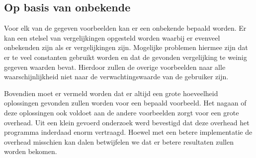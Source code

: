 \documentclass[Main.tex]{subfiles}
\begin{document}
\subsection{Op basis van onbekende}
Voor elk van de gegeven voorbeelden kan er een onbekende bepaald worden. Er kan een stelsel van vergelijkingen opgesteld worden waarbij er evenveel onbekenden zijn als er vergelijkingen zijn. Mogelijke problemen hiermee zijn dat er te veel constanten gebruikt worden en dat de gevonden vergelijking te weinig gegeven waarden bevat. Hierdoor zullen de overige voorbeelden naar alle waarschijnlijkheid niet naar de verwachtingswaarde van de gebruiker zijn.\par
Bovendien moet er vermeld worden dat er altijd een grote hoeveelheid oplossingen gevonden zullen worden voor een bepaald voorbeeld. Het nagaan of deze oplossingen ook voldoet aan de andere voorbeelden zorgt voor een grote overhead. Uit een klein gevoerd onderzoek werd bevestigd dat deze overhead het programma inderdaad enorm vertraagd. Hoewel met een betere implementatie de overhead misschien kan dalen betwijfelen we dat er betere resultaten zullen worden bekomen.
\end{document}
